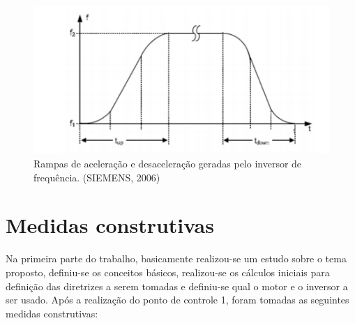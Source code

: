 \begin{figure}[h!]
	\centering
		\includegraphics[keepaspectratio=true,scale=0.9]{figuras/4.png}
	\caption{Rampas de aceleração e desaceleração geradas pelo inversor de frequência. (SIEMENS, 2006)}
    \label{rampas}
\end{figure}

\section{Medidas construtivas}

Na primeira parte do trabalho, basicamente realizou-se um estudo sobre o tema proposto, definiu-se os conceitos básicos, realizou-se os cálculos iniciais para definição das diretrizes a serem tomadas e definiu-se qual o motor e o inversor a ser usado. Após a realização do ponto de controle 1, foram tomadas as seguintes medidas construtivas:

